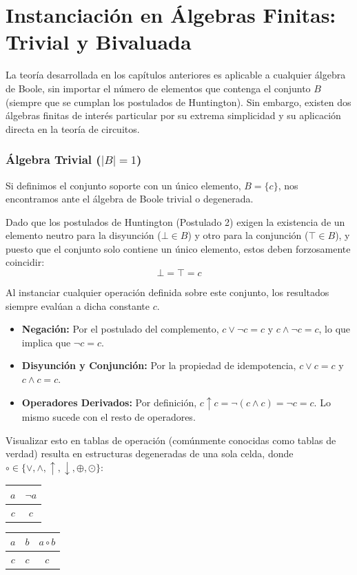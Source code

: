 \chapter{Instanciación en Álgebras Finitas: Trivial y Bivaluada}

La teoría desarrollada en los capítulos anteriores es aplicable a cualquier álgebra de Boole, sin importar el número de elementos que contenga el conjunto $B$ (siempre que se cumplan los postulados de Huntington). Sin embargo, existen dos álgebras finitas de interés particular por su extrema simplicidad y su aplicación directa en la teoría de circuitos.

\subsection{Álgebra Trivial ($|B| = 1$)}
Si definimos el conjunto soporte con un único elemento, $B = \{ c \}$, nos encontramos ante el álgebra de Boole trivial o degenerada. 

Dado que los postulados de Huntington (Postulado 2) exigen la existencia de un elemento neutro para la disyunción ($\bot \in B$) y otro para la conjunción ($\top \in B$), y puesto que el conjunto solo contiene un único elemento, estos deben forzosamente coincidir:
\[ \bot = \top = c \]

Al instanciar cualquier operación definida sobre este conjunto, los resultados siempre evalúan a dicha constante $c$. 
\begin{itemize}
    \item \textbf{Negación:} Por el postulado del complemento, $c \vee \neg c = c$ y $c \wedge \neg c = c$, lo que implica que $\neg c = c$.
    \item \textbf{Disyunción y Conjunción:} Por la propiedad de idempotencia, $c \vee c = c$ y $c \wedge c = c$.
    \item \textbf{Operadores Derivados:} Por definición, $c \uparrow c = \neg (c \wedge c) = \neg c = c$. Lo mismo sucede con el resto de operadores.
\end{itemize}

Visualizar esto en tablas de operación (comúnmente conocidas como tablas de verdad) resulta en estructuras degeneradas de una sola celda, donde $\circ \in \{ \vee, \wedge, \uparrow, \downarrow, \oplus, \odot \}$:

\begin{center}
\begin{tabular}{c|c}
$a$ & $\neg a$ \\
\hline
$c$ & $c$
\end{tabular}
\qquad
\begin{tabular}{cc|c}
$a$ & $b$ & $a \circ b$ \\
\hline
$c$ & $c$ & $c$
\end{tabular}
\end{center}

